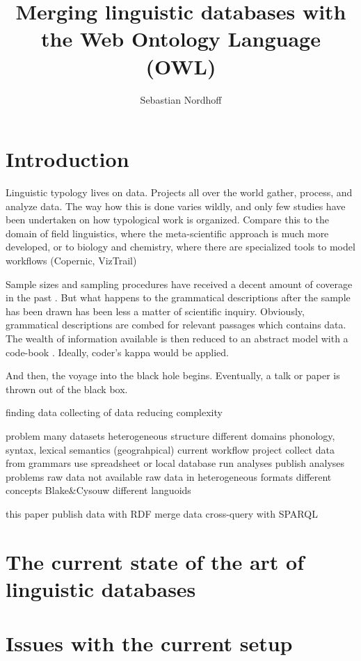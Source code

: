\documentclass[a4paper,10pt]{article}
\title{Merging linguistic databases with the Web Ontology Language (OWL)}
\author{Sebastian Nordhoff}
\begin{document}
 
\section{Introduction}
Linguistic typology lives on data. Projects all over the world gather, process, and analyze data. The way how this is done varies wildly, and only few studies have been undertaken on how typological work is organized. Compare this to the domain of field linguistics, where the meta-scientific approach is much more developed, or to biology and chemistry, where there are specialized tools to model workflows (Copernic, VizTrail)

Sample sizes and sampling procedures have received a decent amount of coverage in the past \citep{LT}. But what happens to the grammatical descriptions after the sample has been drawn has been less a matter of scientific inquiry. Obviously, grammatical descriptions are combed for relevant passages which contains data. The wealth of information available is then reduced to an abstract model with a code-book \citep{Nichols}. Ideally, coder's kappa would be applied. 

And then, the voyage into the black hole begins. Eventually, a talk or paper is thrown out of the black box.

finding data 
collecting of data 
reducing complexity

problem
 many datasets 
 heterogeneous structure
 different domains 
  phonology, syntax, lexical semantics (geograhpical)
 current workflow
  project
   collect data from grammars
   use spreadsheet or local database 
   run analyses 
   publish analyses 
  problems 
   raw data not available
   raw data in heterogeneous formats 
   different concepts Blake&Cysouw
   different languoids   
 
this paper
 publish data with RDF
 merge data
 cross-query with SPARQL

\section{The current state of the art of linguistic databases}

\section{Issues with the current setup}
\end{document}
